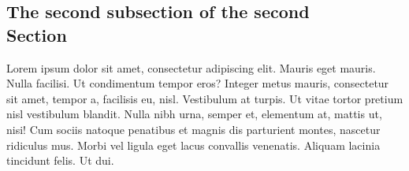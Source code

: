 \documentclass[a4paper,10pt]{article}
\begin{document}
\begin{multicols}{2}
\subsection{The second subsection of the second \\ Section}

Lorem ipsum dolor sit amet, consectetur adipiscing elit. Mauris eget mauris.
Nulla facilisi. Ut condimentum tempor eros? Integer metus mauris, consectetur
sit amet, tempor a, facilisis eu, nisl. Vestibulum at turpis. Ut vitae tortor
pretium nisl vestibulum blandit. Nulla nibh urna, semper et, elementum at,
mattis ut, nisi! Cum sociis natoque penatibus et magnis dis parturient montes,
nascetur ridiculus mus. Morbi vel ligula eget lacus convallis venenatis. Aliquam
lacinia tincidunt felis. Ut dui.

%
%

\end{multicols}
\end{document}
